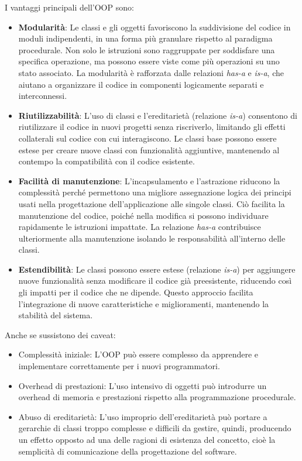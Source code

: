 \documentclass[
  letterpaper,
]{scrbook}
\begin{document}
I vantaggi principali dell'OOP sono:

\begin{itemize}
\item
  \textbf{Modularità}: Le classi e gli oggetti favoriscono la
  suddivisione del codice in moduli indipendenti, in una forma più
  granulare rispetto al paradigma procedurale. Non solo le istruzioni
  sono raggruppate per soddisfare una specifica operazione, ma possono
  essere viste come più operazioni su uno stato associato. La modularità
  è rafforzata dalle relazioni \emph{has-a} e \emph{is-a}, che aiutano a
  organizzare il codice in componenti logicamente separati e
  interconnessi.
\item
  \textbf{Riutilizzabilità}: L'uso di classi e l'ereditarietà (relazione
  \emph{is-a}) consentono di riutilizzare il codice in nuovi progetti
  senza riscriverlo, limitando gli effetti collaterali sul codice con
  cui interagiscono. Le classi base possono essere estese per creare
  nuove classi con funzionalità aggiuntive, mantenendo al contempo la
  compatibilità con il codice esistente.
\item
  \textbf{Facilità di manutenzione}: L'incapsulamento e l'astrazione
  riducono la complessità perché permettono una migliore assegnazione
  logica dei principi usati nella progettazione dell'applicazione alle
  singole classi. Ciò facilita la manutenzione del codice, poiché nella
  modifica si possono individuare rapidamente le istruzioni impattate.
  La relazione \emph{has-a} contribuisce ulteriormente alla manutenzione
  isolando le responsabilità all'interno delle classi.
\item
  \textbf{Estendibilità}: Le classi possono essere estese (relazione
  \emph{is-a}) per aggiungere nuove funzionalità senza modificare il
  codice già preesistente, riducendo così gli impatti per il codice che
  ne dipende. Questo approccio facilita l'integrazione di nuove
  caratteristiche e miglioramenti, mantenendo la stabilità del sistema.
\end{itemize}

Anche se sussistono dei caveat:

\begin{itemize}
\item
  Complessità iniziale: L'OOP può essere complesso da apprendere e
  implementare correttamente per i nuovi programmatori.
\item
  Overhead di prestazioni: L'uso intensivo di oggetti può introdurre un
  overhead di memoria e prestazioni rispetto alla programmazione
  procedurale.
\item
  Abuso di ereditarietà: L'uso improprio dell'ereditarietà può portare a
  gerarchie di classi troppo complesse e difficili da gestire, quindi,
  producendo un effetto opposto ad una delle ragioni di esistenza del
  concetto, cioè la semplicità di comunicazione della progettazione del
  software.
\end{itemize}
\end{document}
